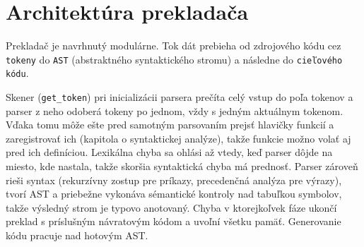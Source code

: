 \section{Architektúra prekladača}
Prekladač je navrhnutý modulárne. Tok dát prebieha od zdrojového kódu cez \texttt{tokeny} do \texttt{AST} (abstraktného syntaktického stromu) a následne do \texttt{cieľového kódu}.

Skener (\texttt{get\_token}) pri inicializácii parsera prečíta celý vstup do poľa tokenov a parser z neho odoberá tokeny po jednom, vždy s jedným aktuálnym tokenom. Vďaka tomu môže ešte pred samotným parsovaním prejsť hlavičky funkcií a zaregistrovať ich (kapitola o syntaktickej analýze), takže funkcie možno volať aj pred ich definíciou. Lexikálna chyba sa ohlási až vtedy, keď parser dôjde na miesto, kde nastala, takže skoršia syntaktická chyba má prednosť. Parser zároveň rieši syntax (rekurzívny zostup pre príkazy, precedenčná analýza pre výrazy), tvorí AST a priebežne vykonáva sémantické kontroly nad tabuľkou symbolov, takže výsledný strom je typovo anotovaný. Chyba v ktorejkoľvek fáze ukončí preklad s príslušným návratovým kódom a uvoľní všetku pamäť. Generovanie kódu pracuje nad hotovým AST.